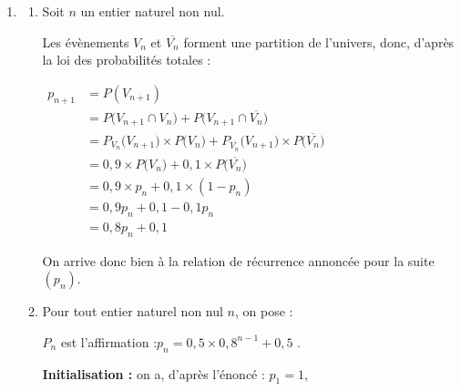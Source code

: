 \begin{enumerate}
\begin{enumerate}
		\item Les évènements $V_2$ et $\overline{V_2}$ partitionnent l'univers, donc, d'après la loi des probabilités totales :

$P(V_3) = P\big(V_3 \cap V_2\big) + P\left(V_3 \cap \overline{V_2}\right) = 0,9 \times 0,9 + 0,1 \times 0,1 = 0,81 + 0,01 = 0,82$.

		On arrive bien à $P(V_3) = 0,82$.

		\item On demande de calculer : $P_{V_3}(V_2)$.

		D'après la définition, on a :\quad $P_{V_3}(V_2) = \dfrac{P(V_3 \cap V_2)}{P(V_3)} = \dfrac{0,9 \times 0,9}{0,82} = \dfrac{81}{82} \approx 0,988$.

		À $10^{-3}$ près, la probabilité que la machine 2 détienne 1, sachant que la machine 3 détient 1 est d'environ 0,988.
	\end{enumerate}

	\item \begin{enumerate}
		\item Soit $n$ un entier naturel non nul.

		Les évènements $V_n$ et $\overline{V_n}$ forment une partition de l'univers, donc, d'après la loi des probabilités totales :

		$\begin{aligned}
			p_{n+1} &= P(V_{n+1}) \\
			&= P\big(V_{n+1} \cap V_n\big) + P\big(V_{n+1} \cap \overline{V_n}\big)\\
			&= P_{V_n}\big(V_{n+1}\big)\times P\big(V_n\big) + P_{\overline{V_n}}\big(V_{n+1}\big)\times P\big(\overline{V_n}\big)\\
			&= 0,9\times P\big(V_n\big) + 0,1 \times  P\big(\overline{V_n}\big)\\
			&= 0,9\times p_n + 0,1 \times  (1 - p_n)\\
			&= 0,9p_n + 0,1 - 0,1 p_n\\
			&= 0,8 p_n + 0,1
		\end{aligned}$

		On arrive donc bien à la relation de récurrence annoncée pour la suite $(p_n)$.

		\item Pour tout entier naturel non nul $n$, on pose :

$P_n$ est l'affirmation :\quad \og $p_n = 0,5\times 0,8^{n-1} + 0,5$ \fg{}.

\textbf{Initialisation :} on a, d'après l'énoncé : \quad $p_1 = 1$,


\end{enumerate}
\end{enumerate}
